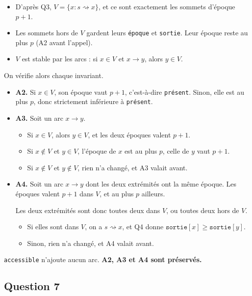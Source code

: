 \documentclass[11pt,a4paper]{article}
\providecommand{\tightlist}{\setlength{\itemsep}{0pt}\setlength{\parskip}{0pt}}
\begin{document}
\begin{itemize}
\tightlist
\item
  D'après Q3, \(V=\{x : s\rightsquigarrow x\}\), et ce sont exactement les sommets d'époque \(p+1\).
\item
  Les sommets hors de \(V\) gardent leurs \texttt{époque} et \texttt{sortie}. Leur époque reste au plus \(p\) (A2 avant l'appel).
\item
  \(V\) est stable par les arcs : si \(x\in V\) et \(x\to y\), alors \(y\in V\).
\end{itemize}

On vérifie alors chaque invariant.

\begin{itemize}
\item
  \textbf{A2.} Si \(x\in V\), son époque vaut \(p+1\), c'est-à-dire \texttt{présent}. Sinon, elle est au plus \(p\), donc strictement inférieure à \texttt{présent}.
\item
  \textbf{A3.} Soit un arc \(x\to y\).

  \begin{itemize}
  \tightlist
  \item
    Si \(x\in V\), alors \(y\in V\), et les deux époques valent \(p+1\).
  \item
    Si \(x\notin V\) et \(y\in V\), l'époque de \(x\) est au plus \(p\), celle de \(y\) vaut \(p+1\).
  \item
    Si \(x\notin V\) et \(y\notin V\), rien n'a changé, et A3 valait avant.
  \end{itemize}
\item
  \textbf{A4.} Soit un arc \(x\to y\) dont les deux extrémités ont la même époque. Les époques valent \(p+1\) dans \(V\), et au plus \(p\) ailleurs.

  Les deux extrémités sont donc toutes deux dans \(V\), ou toutes deux hors de \(V\).

  \begin{itemize}
  \tightlist
  \item
    Si elles sont dans \(V\), on a \(s\rightsquigarrow x\), et Q4 donne \(\texttt{sortie}[x]\ge\texttt{sortie}[y]\).
  \item
    Sinon, rien n'a changé, et A4 valait avant.
  \end{itemize}
\end{itemize}

\texttt{accessible} n'ajoute aucun arc. \textbf{A2, A3 et A4 sont préservés.}

\hypertarget{question-7}{%
\subsection{Question 7}\label{question-7}}
\end{document}
